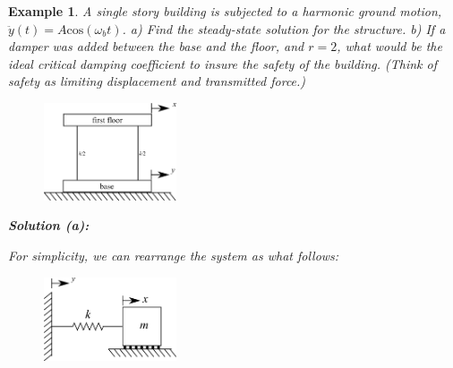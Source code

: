\documentclass[12pt,letter]{article}
\newtheorem{ex}{Example}
\numberwithin{ex}{section} %
\newenvironment{example}{\begin{mdframed}[middlelinewidth=0.5mm]\begin{ex}\normalfont}{\end{ex}\end{mdframed}}
\numberwithin{re}{section} %
\begin{document}
				\begin{example}
		
					A single story building is subjected to a harmonic ground motion, $\ddot{y}(t) = A \text{cos}(\omega_b t)$. a) Find the steady-state solution for the structure.  b) If a damper was added between the base and the floor, and $r=2$, what would be the ideal critical damping coefficient to insure the safety of the building. (Think of safety as limiting displacement and transmitted force.) 
					\begin{figure}[H]
						\centering
						\includegraphics[width=0.35\textwidth]{../Figures/base_excited_structure.png}
					\end{figure}				
								
					\noindent\textbf{Solution (a):}
						
					For simplicity, we can rearrange the system as what follows:
					\begin{figure}[H]
						\centering
						\includegraphics[width=0.35\textwidth]{../Figures/base_excited_structure_simple.png}
					\end{figure}			
		

\end{example}
\end{document}
